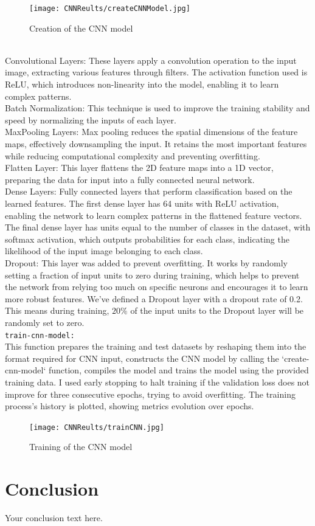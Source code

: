 \documentclass{article}
\newcommand{\code}[1]{\colorbox{light-gray}{\texttt{#1}}}
\begin{document}
\begin{figure}[h]
\caption{Creation of the CNN model}
\centering
\texttt{[image: CNNReults/createCNNModel.jpg]}
\end{figure}
\text{ }\\
Convolutional Layers: These layers apply a convolution operation to the input image,
extracting various features through filters.
The activation function used is ReLU,
which introduces non-linearity into the model, enabling it to learn complex patterns.\\\newline
Batch Normalization: This technique is used to improve the training stability and speed
by normalizing the inputs of each layer.\\\newline
MaxPooling Layers: Max pooling reduces the spatial dimensions of the feature maps,
effectively downsampling the input.
It retains the most important features while reducing computational
complexity and preventing overfitting.\\\newline
Flatten Layer: This layer flattens the 2D feature maps into a 1D vector,
preparing the data for input into a fully connected neural network.\\\newline
Dense Layers: Fully connected layers that perform classification based on the learned features.
The first dense layer has 64 units with ReLU activation, enabling the network to learn complex
patterns in the flattened feature vectors.
The final dense layer has units equal to the number of classes
in the dataset, with softmax activation, which outputs probabilities for each class,
indicating the likelihood of the input image belonging to each class.\\\newline
Dropout: This layer was added to prevent overfitting.
It works by randomly setting a fraction of input units to zero during training,
which helps to prevent the network from relying too much on specific neurons
and encourages it to learn more robust features.
We've defined a Dropout layer with a dropout rate of 0.2.
This means during training, ${20\%}$ of the input units to the Dropout layer will be randomly set to zero.\\\newline
\code{train-cnn-model:}\\\newline
This function prepares the training and test datasets by reshaping them into the format
required for CNN input, constructs the CNN model by calling the `create-cnn-model` function,
compiles the model and trains the model using the provided training data.
I used early stopping to halt training if the validation loss does not improve for three consecutive epochs,
trying to avoid overfitting.
The training process's history is plotted, showing metrics evolution over epochs.\\

\begin{figure}[h]
\caption{Training of the CNN model}
\centering
\texttt{[image: CNNReults/trainCNN.jpg]}
\end{figure}


\newpage
\section{Conclusion}
Your conclusion text here.
\end{document}
